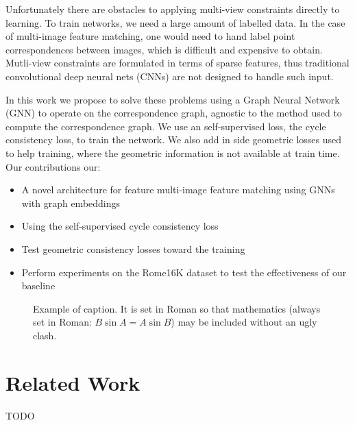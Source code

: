 \documentclass[10pt,twocolumn,letterpaper]{article}
\begin{document}
Unfortunately there are obstacles to applying multi-view constraints directly to learning. 
To train networks, we need a large amount of labelled data.
In the case of multi-image feature matching, one would need to hand label point correspondences between images, which is difficult and expensive to obtain.
Mutli-view constraints are formulated in terms of sparse features, thus traditional convolutional deep neural nets (CNNs) are not designed to handle such input.

In this work we propose to solve these problems using a Graph Neural Network (GNN) to operate on the correspondence graph, agnostic to the method used to compute the correspondence graph. We use an self-supervised loss, the cycle consistency loss, to train the network. We also add in side geometric losses used to help training, where the geometric information is not available at train time.
Our contributions our:
\begin{itemize}
\item A novel architecture for feature multi-image feature matching using GNNs with graph embeddings
\item Using the self-supervised cycle consistency loss
\item Test geometric consistency losses toward the training
\item Perform experiments on the Rome16K dataset to test the effectiveness of our baseline
\end{itemize}




\begin{figure}[t]
\begin{center}
  \fbox{\rule{0pt}{2in} \rule{0.9\linewidth}{0pt}}
\end{center}
   \caption{Example of caption.  It is set in Roman so that mathematics
   (always set in Roman: $B \sin A = A \sin B$) may be included without an
   ugly clash.}
\label{fig:long}
\label{fig:onecol}
\end{figure}


\section{Related Work}

TODO

\end{document}
